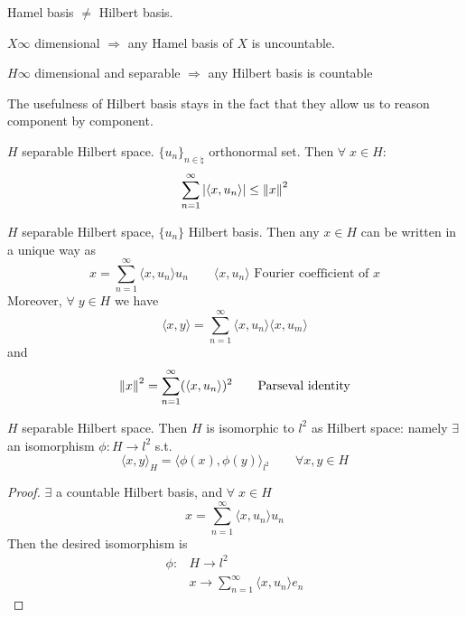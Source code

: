 \begin{remark}
    Hamel basis \(\neq\) Hilbert basis.

    \(X \infty\) dimensional \(\Rightarrow\) any Hamel basis of \(X\) is uncountable.

    \(H \infty\) dimensional and separable \(\Rightarrow\) any Hilbert basis is countable
\end{remark}

The usefulness of Hilbert basis stays in the fact that they allow us to reason component by component.

\begin{theorem}
    \(H\) separable Hilbert space. \(\{u_n\}_{n \in \natural}\) orthonormal set. Then \(\forall \; x \in H\):
    \[
        \sum_{n=1}^\infty \abs{\langle x, u_n\rangle  } \leq \norm{x}^2
    \]
\end{theorem}
\begin{theorem}
    \(H\) separable Hilbert space, \(\{u_n\}\) Hilbert basis.
    Then any \(x \in H\) can be written in a unique way as 
    \[
        x = \sum_{n=1}^\infty \langle x, u_n\rangle   u_n \qquad \langle x, u_n\rangle   \text{ Fourier coefficient of }x
    \]
    Moreover, \(\forall\; y \in H\) we have
    \[
        \langle x, y\rangle   = \sum_{n=1}^\infty \langle x, u_n\rangle   \langle x, u_m\rangle  
    \]
    and 
    \[
        \norm{x}^2 = \sum_{n=1}^\infty (\langle x, u_n\rangle  )^2 \tag*{Parseval identity}
    \]
\end{theorem}
\begin{theorem}
    \(H\) separable Hilbert space. Then \(H\) is isomorphic to \(l^2\) as Hilbert space: namely \(\exists\) an isomorphism \(\phi: H \to l^2\) s.t.
    \[
        \langle x, y\rangle  _H = \langle \phi(x), \phi(y)\rangle  _{l^2} \qquad \forall x, y \in H
    \]
\end{theorem}
\begin{proof}
    \(\exists\) a countable Hilbert basis, and \(\forall\; x \in H\)
    \[
        x = \sum_{n=1}^\infty \langle x, u_n\rangle   u_n
    \]
    Then the desired isomorphism is
    \[
        \begin{array}{rl}
            \phi: & H \to l^2 \\
            & x \to \sum_{n=1}^\infty \langle x, u_n\rangle   e_n
        \end{array}
    \]
\end{proof}

